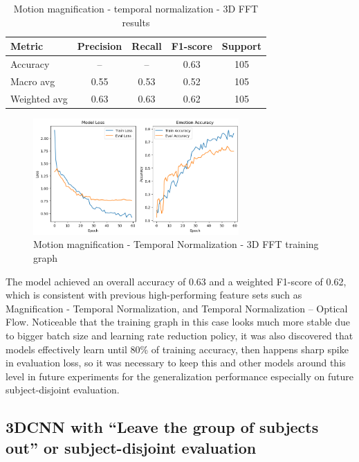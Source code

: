 \documentclass{article}
\begin{document}
\begin{table}[H]
\centering
\caption{Motion magnification - temporal normalization - 3D FFT results}
\begin{tabular}{|l|c|c|c|c|}
\hline
\textbf{Metric} & \textbf{Precision} & \textbf{Recall} & \textbf{F1-score} & \textbf{Support} \\
\hline
Accuracy       & --   & --   & 0.63 & 105 \\
Macro avg      & 0.55 & 0.53 & 0.52 & 105 \\
Weighted avg   & 0.63 & 0.63 & 0.62 & 105 \\
\hline
\end{tabular}%
\label{tab:table9}
\end{table}

\begin{figure}[H]
  \begin{center}
    \includegraphics*[width=0.7\textwidth]{Figures/Picture13.png}
  \end{center}
  \caption{Motion magnification - Temporal Normalization - 3D FFT training graph}
  \label{fig:fig13}
\end{figure}

The model achieved an overall accuracy of 0.63 and a weighted F1-score of 0.62, which is consistent with previous high-performing feature sets such as Magnification - Temporal Normalization, and Temporal Normalization – Optical Flow. Noticeable that the training graph in this case looks much more stable due to bigger batch size and learning rate reduction policy, it was also discovered that models effectively learn until 80\% of training accuracy, then happens sharp spike in evaluation loss, so it was necessary to keep this and other models around this level in future experiments for the generalization performance especially on future subject-disjoint evaluation.

\subsection{3DCNN with “Leave the group of subjects out” or subject-disjoint evaluation}
\end{document}
